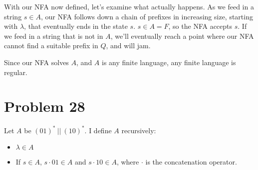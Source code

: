 \documentclass[11pt]{article}
\begin{document}
With our NFA now defined, let's examine what actually happens. As we feed in a string $s \in A$, our NFA follows down a chain of prefixes in increasing size, starting with $\lambda$, that eventually ends in the state $s$. $s \in A = F$, so the NFA accepts $s$. If we feed in a string that is not in $A$, we'll eventually reach a point where our NFA cannot find a suitable prefix in $Q$, and will jam.

Since our NFA solves $A$, and $A$ is any finite language, any finite language is regular.

\section*{Problem 28}

Let $A$ be $(01)^*\ ||\ (10)^*$. I define $A$ recursively:
	\begin{itemize}
		\item $\lambda \in A$
		\item If $s \in A$, $s \cdot 01 \in A$ and $s \cdot 10 \in A$, where $\cdot$ is the concatenation operator.
	\end{itemize}
\end{document}

